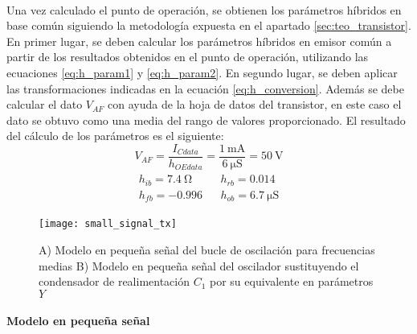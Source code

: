 \paragraph{}
Una vez calculado el punto de operaci\'on, se obtienen los par\'ametros h\'ibridos en base com\'un siguiendo la metodolog\'ia expuesta en el apartado \ref{sec:teo_transistor}. En primer lugar, se deben calcular los parámetros híbridos en emisor común a partir de los resultados obtenidos en el punto de operación, utilizando las ecuaciones \ref{eq:h_param1} y \ref{eq:h_param2}. En segundo lugar, se deben aplicar las transformaciones indicadas en la ecuaci\'on \ref{eq:h_conversion}. Adem\'as se debe calcular el dato $V_{AF}$ con ayuda de la hoja de datos del transistor, en este caso el dato se obtuvo como una media del rango de valores proporcionado. El resultado del c\'alculo de los par\'ametros es el siguiente:
\begin{equation}
   \label{eq:result_pol1}
V_{AF} = \frac{I_{Cdata}}{h_{OEdata}} =\frac{\SI{1}{\milli\ampere}}{\SI{6}{\micro\siemens}} =  \SI{50}{\volt} 
\end{equation}
\begin{equation}
   \label{eq:result_pol2}
\begin{array}{rl} 
      \begin{array}{l}
	 h_{ib} =  \SI{7.4}{\ohm} \\
	 h_{fb} =  -0.996
      \end{array}
      &
      \begin{array}{l}
	 h_{rb} =  0.014 \\
	 h_{ob} =  \SI{6.7}{\micro\siemens}
      \end{array}
\end{array}
\end{equation}

\begin{figure}[h]
    \centering
    \texttt{[image: small\_signal\_tx]}
    \caption{A) Modelo en pequeña señal del bucle de oscilación para frecuencias medias B) Modelo en pequeña señal del oscilador sustituyendo el condensador de realimentación $C_1$ por su equivalente en parámetros $Y$}
    \label{fig:ss_tx}
\end{figure}

\paragraph{Modelo en pequeña señal} %
